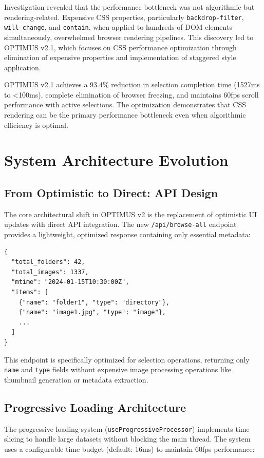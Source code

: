 \documentclass[10pt]{article}
\begin{document}
Investigation revealed that the performance bottleneck was not algorithmic but rendering-related. Expensive CSS properties, particularly \texttt{backdrop-filter}, \texttt{will-change}, and \texttt{contain}, when applied to hundreds of DOM elements simultaneously, overwhelmed browser rendering pipelines. This discovery led to OPTIMUS v2.1, which focuses on CSS performance optimization through elimination of expensive properties and implementation of staggered style application.

OPTIMUS v2.1 achieves a 93.4\% reduction in selection completion time (1527ms to <100ms), complete elimination of browser freezing, and maintains 60fps scroll performance with active selections. The optimization demonstrates that CSS rendering can be the primary performance bottleneck even when algorithmic efficiency is optimal.

\section{System Architecture Evolution}

\subsection{From Optimistic to Direct: API Design}

The core architectural shift in OPTIMUS v2 is the replacement of optimistic UI updates with direct API integration. The new \texttt{/api/browse-all} endpoint provides a lightweight, optimized response containing only essential metadata:

\begin{lstlisting}[caption={Browse-All API Response Structure}]
{
  "total_folders": 42,
  "total_images": 1337,
  "mtime": "2024-01-15T10:30:00Z",
  "items": [
    {"name": "folder1", "type": "directory"},
    {"name": "image1.jpg", "type": "image"},
    ...
  ]
}
\end{lstlisting}

This endpoint is specifically optimized for selection operations, returning only \texttt{name} and \texttt{type} fields without expensive image processing operations like thumbnail generation or metadata extraction.

\subsection{Progressive Loading Architecture}

The progressive loading system (\texttt{useProgressiveProcessor}) implements time-slicing to handle large datasets without blocking the main thread. The system uses a configurable time budget (default: 16ms) to maintain 60fps performance:
\end{document}
